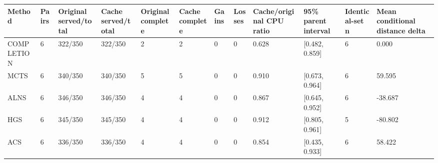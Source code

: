 \begin{tabular}{llllllllllll}
\hline
Method & Pairs & Original served/total & Cache served/total & Original complete & Cache complete & Gains & Losses & Cache/original CPU ratio & 95\% parent interval & Identical-set n & Mean conditional distance delta \\
\hline
COMPLETION & 6 & 322/350 & 322/350 & 2 & 2 & 0 & 0 & 0.628 & [0.482, 0.859] & 6 & 0.000 \\
MCTS & 6 & 340/350 & 340/350 & 5 & 5 & 0 & 0 & 0.910 & [0.673, 0.964] & 6 & 59.595 \\
ALNS & 6 & 346/350 & 346/350 & 4 & 4 & 0 & 0 & 0.867 & [0.645, 0.952] & 6 & -38.687 \\
HGS & 6 & 345/350 & 345/350 & 4 & 4 & 0 & 0 & 0.912 & [0.805, 0.961] & 5 & -80.802 \\
ACS & 6 & 336/350 & 336/350 & 4 & 4 & 0 & 0 & 0.854 & [0.435, 0.933] & 6 & 58.422 \\
\hline
\end{tabular}
